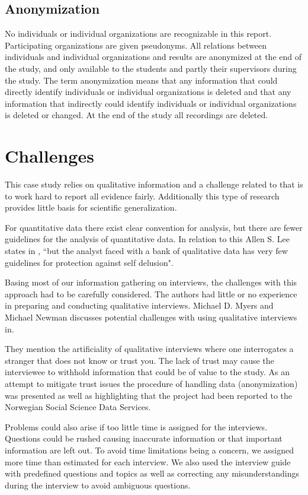 \subsection{Anonymization}
No individuals or individual organizations are recognizable in this report. Participating organizations are given pseudonyms. All relations between individuals and individual organizations and results are anonymized at the end of the study, and only available to the students and partly their supervisors during the study. The term anonymization means that any information that could directly identify individuals or individual organizations is deleted and that any information that indirectly could identify individuals or individual organizations is deleted or changed. At the end of the study all recordings are deleted.

\section{Challenges}
This case study relies on qualitative information and a challenge related to that is to work hard to report all evidence fairly. Additionally this type of research provides little basis for scientific generalization. \cite{CaseStudyResearch}

For quantitative data there exist clear convention for analysis, but there are fewer guidelines for the analysis of quantitative data. In relation to this Allen S. Lee states in \cite{lee1989scientific}, ``but the analyst faced with a bank of qualitative data has very few guidelines for protection against self delusion".

Basing most of our information gathering on interviews, the challenges with this approach had to be carefully considered. The authors had little or no experience in preparing and conducting qualitative interviews. Michael D. Myers and Michael Newman discusses potential challenges with using qualitative interviews in\cite{myers2007qualitative}. 

They mention the artificiality of qualitative interviews where one interrogates a stranger that does not know or trust you. The lack of trust may cause the interviewee to withhold information that could be of value to the study. As an attempt to mitigate trust issues the procedure of handling data (anonymization) was presented as well as highlighting that the project had been reported to the Norwegian Social Science Data Services.   

Problems could also arise if too little time is assigned for the interviews. Questions could be rushed causing inaccurate information or that important information are left out. To avoid time limitations being a concern, we assigned more time than estimated for each interview. We also used the interview guide with predefined questions and topics as well as correcting any misunderstandings during the interview to avoid ambiguous questions.

